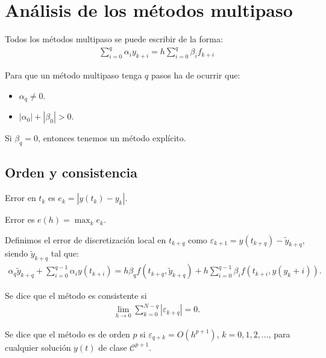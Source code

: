 \section{Análisis de los métodos multipaso}

\noindent Todos los métodos multipaso se puede escribir de la forma:
\begin{align*}
    \sum_{i=0}^{q} \alpha_i y_{k+i} = h\sum_{i=0}^{q} \beta_i f_{k+i}
\end{align*}

\begin{obs}
Para que un método multipaso tenga $q$ pasos ha de ocurrir que:
\begin{itemize}
    \item $\alpha_q \not = 0$.
    \item $|\alpha_0| + |\beta_0| > 0$.
\end{itemize}
Si $\beta_q = 0$, entonces tenemos un método explícito.
\end{obs}

\subsection{Orden y consistencia}

\begin{defi}
Error en $t_k$ es $e_k = |y(t_k) - y_k|$.
\end{defi}
\begin{defi}
Error es $e(h) = \max_{k} e_k$.
\end{defi}

\begin{defi}
Definimos el error de discretización local en $t_{k+q}$ como $\varepsilon_{k+1} = y(t_{k+q}) - \widetilde{y}_{k+q}$, siendo $\widetilde{y}_{k+q}$ tal que:
\begin{align*}
    \alpha_q \widetilde{y}_{k+q} + \sum_{i=0}^{q-1} \alpha_i y(t_{k+i}) = h\beta_q f(t_{k+q},\widetilde{y}_{k+q}) + h\sum_{i=0}^{q-1} \beta_i f(t_{k+i},y(y_k+i)).
\end{align*}
\end{defi}

\begin{defi}
Se dice que el método es consistente si
\begin{align*}
    \lim_{h \to 0} \sum_{k=0}^{N - q} |\varepsilon_{k+q}| = 0.
\end{align*}
\end{defi}

\begin{defi}
Se dice que el método es de orden $p$ si $\varepsilon_{q+k} = O(h^{p+1})$, $k=0,1,2,\ldots$, para cualquier solución $y(t)$ de clase $\mathscr{C}^{p+1}$.
\end{defi}

